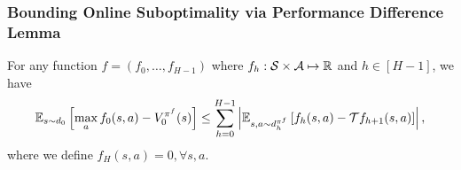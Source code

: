 \subsubsection{Bounding Online Suboptimality via Performance Difference Lemma}
\begin{lemma}
    \label{lemma:perf-diff-online}
    For any function $f=(f_0,\dots,f_{H-1})$ where $f_h:\mathcal S\times \mathcal A\mapsto \mathbb R$ and $h\in[H-1]$, we have
    \begin{equation}
        \mathbb E_{s\sim d_0}\left[ \max_a f_0(s,a)-V_0^{\pi^f}(s) \right]\leq \sum_{h=0}^{H-1}\left| \mathbb E_{s,a\sim d_h^{\pi^f}}\left[ f_h(s,a)-\mathcal Tf_{h+1}(s,a) \right] \right|,
    \end{equation}
    where we define $f_H(s,a)=0,\forall s,a$.
\end{lemma}

